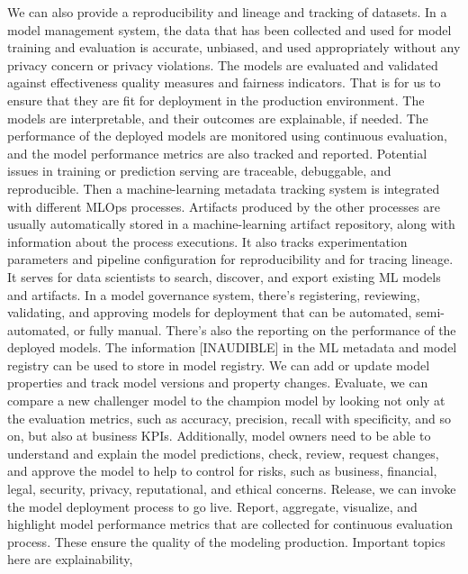 {{{{{{{{    We can also provide a reproducibility and lineage and tracking of datasets.
    In a model management system, the data that has been collected and used
    for model training and evaluation is accurate, unbiased,
    and used appropriately without any privacy concern or privacy violations.
    The models are evaluated and validated against effectiveness quality measures
    and fairness indicators.
    That is for us to ensure that they are fit for deployment in the production
    environment.
    The models are interpretable, and their outcomes are explainable, if needed.
    The performance of the deployed models are
    monitored using continuous evaluation, and the model performance metrics
    are also tracked and reported.
    Potential issues in training or prediction
    serving are traceable, debuggable, and reproducible.
    Then a machine-learning metadata tracking system
    is integrated with different MLOps processes.
    Artifacts produced by the other processes
    are usually automatically stored in a machine-learning artifact
    repository, along with information about the process executions.
    It also tracks experimentation parameters and pipeline configuration
    for reproducibility and for tracing lineage.
    It serves for data scientists to search, discover, and export
    existing ML models and artifacts.
    In a model governance system, there's registering, reviewing, validating,
    and approving models for deployment that can be automated, semi-automated,
    or fully manual.
    There's also the reporting on the performance of the deployed models.
    The information [INAUDIBLE] in the ML metadata and model registry
    can be used to store in model registry.
    We can add or update model properties and track model versions and property
    changes.
    Evaluate, we can compare a new challenger model to the champion model
    by looking not only at the evaluation metrics, such as accuracy, precision,
    recall with specificity, and so on, but also at business KPIs.
    Additionally, model owners need to be able to understand and explain
    the model predictions, check, review, request changes, and approve the model
    to help to control for risks, such as business, financial, legal, security,
    privacy, reputational, and ethical concerns.
    Release, we can invoke the model deployment process to go live.
    Report, aggregate, visualize, and highlight model performance metrics
    that are collected for continuous evaluation process.
    These ensure the quality of the modeling production.
    Important topics here are explainability,
}}}}}}}}
